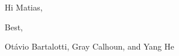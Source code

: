 \documentclass[12pt,fleqn]{article}
\begin{document}
\noindent%
Hi Matias,

\strut

\noindent%
Best,

\noindent%
Ot\'avio Bartalotti, Gray Calhoun, and Yang He
\end{document}
